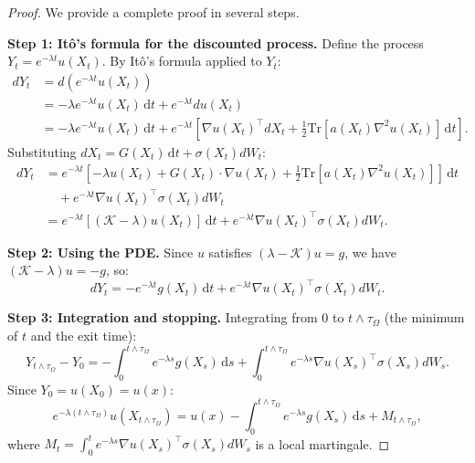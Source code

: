 \documentclass[11pt,a4paper]{article}
\newcommand{\Tr}{\mathrm{Tr}}
\newcommand{\dt}{\,\mathrm{d}t}
\newcommand{\ds}{\,\mathrm{d}s}
\newcommand{\Koop}{\mathcal{K}}
\begin{document}
\begin{proof}
We provide a complete proof in several steps.

\textbf{Step 1: It\^{o}'s formula for the discounted process.}
Define the process $Y_t = e^{-\lambda t} u(X_t)$. By It\^{o}'s formula applied to $Y_t$:
\begin{align}
dY_t &= d(e^{-\lambda t} u(X_t)) \\
&= -\lambda e^{-\lambda t} u(X_t) \dt + e^{-\lambda t} du(X_t) \\
&= -\lambda e^{-\lambda t} u(X_t) \dt + e^{-\lambda t} \left[\nabla u(X_t)^\top dX_t + \frac{1}{2}\Tr[a(X_t)\nabla^2 u(X_t)]\dt\right].
\end{align}
Substituting $dX_t = G(X_t)\dt + \sigma(X_t)dW_t$:
\begin{align}
dY_t &= e^{-\lambda t}\left[-\lambda u(X_t) + G(X_t)\cdot\nabla u(X_t) + \frac{1}{2}\Tr[a(X_t)\nabla^2 u(X_t)]\right]\dt \\
&\quad + e^{-\lambda t}\nabla u(X_t)^\top \sigma(X_t) dW_t \\
&= e^{-\lambda t}\left[(\Koop - \lambda) u(X_t)\right]\dt + e^{-\lambda t}\nabla u(X_t)^\top \sigma(X_t) dW_t.
\end{align}

\textbf{Step 2: Using the PDE.}
Since $u$ satisfies $(\lambda - \Koop)u = g$, we have $(\Koop - \lambda)u = -g$, so:
\begin{equation}
dY_t = -e^{-\lambda t} g(X_t)\dt + e^{-\lambda t}\nabla u(X_t)^\top \sigma(X_t) dW_t.
\end{equation}

\textbf{Step 3: Integration and stopping.}
Integrating from $0$ to $t \wedge \tau_\Omega$ (the minimum of $t$ and the exit time):
\begin{equation}
Y_{t \wedge \tau_\Omega} - Y_0 = -\int_0^{t \wedge \tau_\Omega} e^{-\lambda s} g(X_s)\ds + \int_0^{t \wedge \tau_\Omega} e^{-\lambda s}\nabla u(X_s)^\top \sigma(X_s) dW_s.
\end{equation}
Since $Y_0 = u(X_0) = u(x)$:
\begin{equation}
e^{-\lambda(t \wedge \tau_\Omega)} u(X_{t \wedge \tau_\Omega}) = u(x) - \int_0^{t \wedge \tau_\Omega} e^{-\lambda s} g(X_s)\ds + M_{t \wedge \tau_\Omega},
\end{equation}
where $M_t = \int_0^t e^{-\lambda s}\nabla u(X_s)^\top \sigma(X_s) dW_s$ is a local martingale.


\end{proof}
\end{document}

